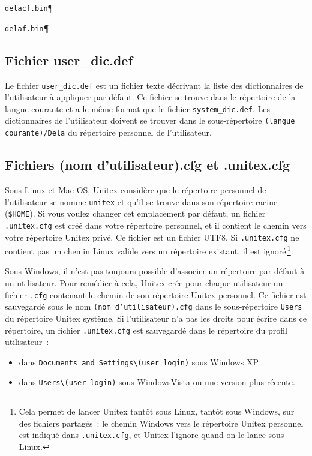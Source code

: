 \bigskip
\verb$delacf.bin$\P

\verb$delaf.bin$\P

\subsection{Fichier user\_dic.def}
Le fichier \verb+user_dic.def+ est un fichier texte décrivant la liste des dictionnaires de
l’utilisateur à appliquer par défaut. Ce fichier se trouve dans le répertoire de la langue courante
et a le même format que le fichier \verb+system_dic.def+. 
Les dictionnaires de l’utilisateur doivent se trouver dans le sous-répertoire \verb+(langue courante)/Dela+ du répertoire personnel de l’utilisateur.


\subsection{Fichiers (nom d’utilisateur).cfg et .unitex.cfg}
Sous Linux et Mac OS, Unitex considère que le répertoire personnel de l’utilisateur se nomme \verb+unitex+ et
qu’il se trouve dans son répertoire racine (\verb+$HOME+). Si vous voulez changer cet emplacement
par défaut, un fichier \verb+.unitex.cfg+ est créé dans votre répertoire personnel, et il contient
le chemin vers votre répertoire Unitex privé. Ce fichier est un fichier UTF8. Si \verb+.unitex.cfg+
ne contient pas un chemin Linux valide vers un répertoire existant, il est ignoré\,\footnote{Cela
permet de lancer Unitex tantôt sous Linux, tantôt sous Windows, sur des fichiers partagés~: le chemin Windows vers le
répertoire Unitex personnel est indiqué dans \texttt{.unitex.cfg}, et Unitex l’ignore quand on le lance
sous Linux.}.


\bigskip
Sous Windows, il n’est pas toujours possible d’associer un répertoire par défaut à un
utilisateur. Pour remédier à cela, Unitex crée pour chaque utilisateur un fichier \verb+.cfg+
contenant le chemin de son répertoire Unitex personnel. Ce fichier est sauvegardé sous le nom
\verb+(nom d’utilisateur).cfg+ dans le sous-répertoire \verb+Users+ du répertoire Unitex système. Si l’utilisateur
n’a pas les droits pour écrire dans ce répertoire, un fichier \verb+.unitex.cfg+ est sauvegardé
dans le répertoire du profil utilisateur~:
\begin{itemize}
\item dans \verb+Documents and Settings\(user login)+ sous Windows XP
\item dans \verb+Users\(user login)+ sous WindowsVista ou une version plus récente.
\end{itemize}

